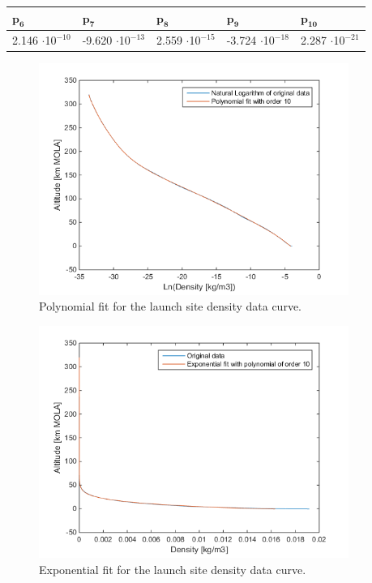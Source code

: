  
 \begin{table}[H]
\begin{center}
{\renewcommand{\arraystretch}{1.2} %
\begin{tabular}{|l|l|l|l|l|}
 \hline
  $\mathbf{p_{6}}$ & $\mathbf{p_{7}}$ & $\mathbf{p_{8}}$ & $\mathbf{p_{9}}$ & $\mathbf{p_{10}}$  \\ \hline 
2.146 $\cdot$10$^{-10}$ & -9.620 $\cdot$10$^{-13}$ & 2.559 $\cdot$10$^{-15}$  & -3.724 $\cdot$10$^{-18}$ & 2.287 $\cdot$10$^{-21}$  \\ \hline 
\end{tabular}
}
\end{center}
\end{table}



\begin{figure}[H]
\centering
\includegraphics[width=0.9\textwidth]{figures/software/completeExpPolyFitDen.png}
\caption{Polynomial fit for the launch site density data curve.}
\label{fig:completeExpPolyFitDen}
\end{figure}

\begin{figure}[H]
\centering
\includegraphics[width=0.9\textwidth]{figures/software/completeExpFitDen.png}
\caption{Exponential fit for the launch site density data curve.}
\label{fig:completeExpFitDen}
\end{figure}


